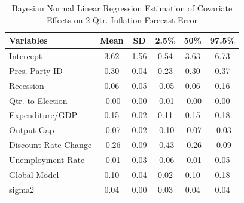 \documentclass[a4paper]{article}
\begin{document}
\begin{table}[ht]
\centering
\caption{Bayesian Normal Linear Regression Estimation of Covariate Effects on 2 Qtr. Inflation Forecast Error} 
\label{OutputNB}
{\small
\begin{tabular}{lccccc}
  \hline
Variables & Mean & SD & 2.5\% & 50\% & 97.5\% \\ 
  \hline
Intercept & 3.62 & 1.56 & 0.54 & 3.63 & 6.73 \\ 
  Pres. Party ID & 0.30 & 0.04 & 0.23 & 0.30 & 0.37 \\ 
  Recession & 0.06 & 0.05 & -0.05 & 0.06 & 0.16 \\ 
  Qtr. to Election & -0.00 & 0.00 & -0.01 & -0.00 & 0.00 \\ 
  Expenditure/GDP & 0.15 & 0.02 & 0.11 & 0.15 & 0.18 \\ 
  Output Gap & -0.07 & 0.02 & -0.10 & -0.07 & -0.03 \\ 
  Discount Rate Change & -0.26 & 0.09 & -0.43 & -0.26 & -0.09 \\ 
  Unemployment Rate & -0.01 & 0.03 & -0.06 & -0.01 & 0.05 \\ 
  Global Model & 0.10 & 0.04 & 0.02 & 0.10 & 0.18 \\ 
  sigma2 & 0.04 & 0.00 & 0.03 & 0.04 & 0.04 \\ 
   \hline
\end{tabular}
}
\end{table}




\end{document}
